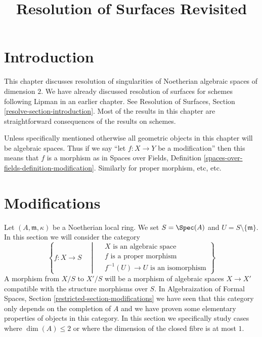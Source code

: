 

%


\title{Resolution of Surfaces Revisited}


\maketitle

\label{section-phantom}

\tableofcontents

\section{Introduction}
\label{section-introduction}

\noindent
This chapter discusses resolution of singularities of
Noetherian algebraic spaces of dimension $2$.
We have already discussed resolution of surfaces
for schemes following Lipman \cite{Lipman} in an earlier
chapter. See
Resolution of Surfaces, Section \ref{resolve-section-introduction}.
Most of the results in this chapter are straightforward
consequences of the results on schemes.

\medskip\noindent
Unless specifically mentioned otherwise all geometric objects
in this chapter will be algebraic spaces. Thus if we say
``let $f : X \to Y$ be a modification'' then this means that
$f$ is a morphism as in Spaces over Fields, Definition
\ref{spaces-over-fields-definition-modification}.
Similarly for proper morphism, etc, etc.










\section{Modifications}
\label{section-modifications}

\noindent
Let $(A, \mathfrak m, \kappa)$ be a Noetherian local ring. We set
$S = \Spec(A)$ and $U = S \setminus \{\mathfrak m\}$. In this section
we will consider the category
\begin{equation}
\label{equation-modification}
\left\{
f : X \longrightarrow S
\quad \middle| \quad
\begin{matrix}
X\text{ is an algebraic space}\\
f\text{ is a proper morphism}\\
f^{-1}(U) \to U\text{ is an isomorphism}
\end{matrix}
\right\}
\end{equation}
A morphism from $X/S$ to $X'/S$ will be a morphism of algebraic spaces
$X \to X'$ compatible with the structure morphisms over $S$. In
Algebraization of Formal Spaces, Section \ref{restricted-section-modifications}
we have seen that this category only depends on the completion of $A$
and we have proven some elementary properties of objects in this category.
In this section we specifically study cases where
$\dim(A) \leq 2$ or where the dimension of the closed fibre is at most $1$.

